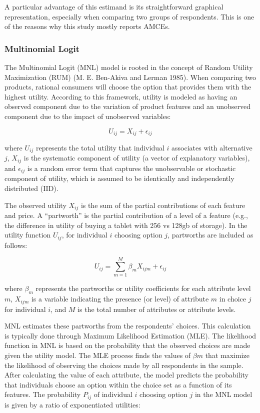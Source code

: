 \documentclass[
  12pt,
]{article}
\begin{document}
A particular advantage of this estimand is its straightforward graphical representation, especially when comparing two groups of respondents. This is one of the reasons why this study mostly reports AMCEs.

\hypertarget{multinomial-logit}{%
\subsubsection{Multinomial Logit}\label{multinomial-logit}}

The Multinomial Logit (MNL) model is rooted in the concept of Random Utility Maximization (RUM) (M. E. Ben-Akiva and Lerman 1985). When comparing two products, rational consumers will choose the option that provides them with the highest utility. According to this framework, utility is modeled as having an observed component due to the variation of product features and an unobserved component due to the impact of unobserved variables:

\[
U_{ij} = X_{ij} + \epsilon_{ij}
\]

where \(U_{ij}\) represents the total utility that individual \(i\) associates with alternative \(j\), \(X_{ij}\) is the systematic component of utility (a vector of explanatory variables), and \(\epsilon_{ij}\) is a random error term that captures the unobservable or stochastic component of utility, which is assumed to be identically and independently distributed (IID).

The observed utility \(X_{ij}\) is the sum of the partial contributions of each feature and price. A ``partworth'' is the partial contribution of a level of a feature (e.g., the difference in utility of buying a tablet with 256 vs 128gb of storage). In the utility function \(U_{ij}\), for individual \(i\) choosing option \(j\), partworths are included as follows:

\[
U_{ij} = \sum_{m=1}^M \beta_{m} X_{ijm} + \epsilon_{ij}
\]

where \(\beta_{m}\) represents the partworths or utility coefficients for each attribute level \(m\), \(X_{ijm}\) is a variable indicating the presence (or level) of attribute \(m\) in choice \(j\) for individual \(i\), and \(M\) is the total number of attributes or attribute levels.

MNL estimates these partworths from the respondents' choices. This calculation is typically done through Maximum Likelihood Estimation (MLE). The likelihood function in MNL is based on the probability that the observed choices are made given the utility model. The MLE process finds the values of \(\beta m\) that maximize the likelihood of observing the choices made by all respondents in the sample. After calculating the value of each attribute, the model predicts the probability that individuals choose an option within the choice set as a function of its features. The probability \(P_{ij}\) of individual \(i\) choosing option \(j\) in the MNL model is given by a ratio of exponentiated utilities:
\end{document}
